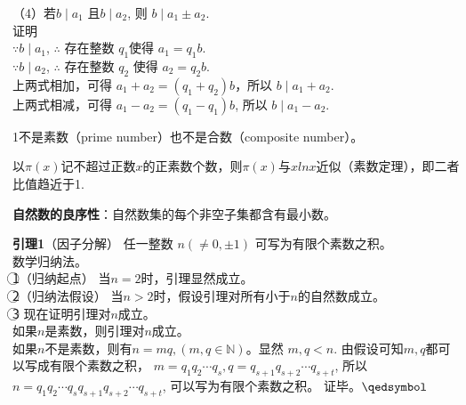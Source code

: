 （4）若$b\mid a_1$ 且$b\mid a_2$, 则 $b\mid a_1\pm a_2$.\\
证明\\
$\because b\mid a_1$, $\therefore$ 存在整数 $q_1$使得 $a_1 = q_1b$.\\
$\because b\mid a_2$, $\therefore$ 存在整数 $q_2$ 使得 $a_2 = q_2b$.\\
上两式相加，可得 $a_1+a_2=(q_1+q_2)b$，所以 $b\mid a_1+a_2$.\\
上两式相减，可得 $a_1-a_2=(q_1-q_1)b$, 所以 $b\mid a_1-a_2$.

1不是素数（prime number）也不是合数（composite number）。

以$\pi(x)$记不超过正数$x$的正素数个数，则$\pi(x)$与$xln x$近似（素数定理），即二者比值趋近于1.

\textbf{自然数的良序性}：自然数集的每个非空子集都含有最小数。

\textbf{引理1}（因子分解） 任一整数 $n(\neq 0, \pm 1)$ 可写为有限个素数之积。\\
数学归纳法。\\
\textcircled{1}（归纳起点） 当$n=2$时，引理显然成立。\\
\textcircled{2}（归纳法假设） 当$n>2$时，假设引理对所有小于$n$的自然数成立。\\
\textcircled{3} 现在证明引理对$n$成立。\\
如果$n$是素数，则引理对$n$成立。\\
如果$n$不是素数，则有$n=mq, (m,q\in \mathbb{N})$。显然 $m,q<n$. 由假设可知$m,q$都可以写成有限个素数之积，
$m=q_1q_2\cdots q_s, q=q_{s+1}q_{s+2}\cdots q_{s+t}$, 
所以$n=q_1q_2\cdots q_s q_{s+1}q_{s+2}\cdots q_{s+t}$, 可以写为有限个素数之积。
证毕。$\hfill\qedsymbol$


